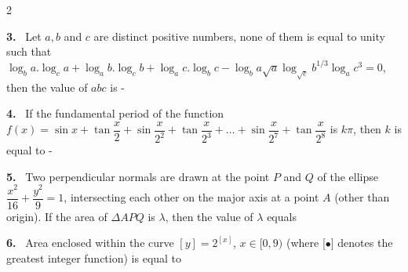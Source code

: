 \documentclass[10pt]{extarticle}
\newcommand{\qn}[1]{\par\smallskip\noindent\textbf{#1.}~}
\begin{document}
\begin{multicols}{2}
\qn{3} Let $a,b$ and $c$ are distinct positive numbers, none of them is equal to unity such that $\log_ba.\log_ca+\log_ab.\log_cb+\log_ac.\log_bc-\log_ba\sqrt a\log_{\sqrt c}b^{1/3}\log_ac^3=0$, then the value of $abc$ is -
\qn{4} If the fundamental period of the function $f(x)=\sin x+\tan\dfrac x2+\sin\dfrac x{2^2}+\tan\dfrac x{2^3}+\dots+\sin\dfrac x{2^7}+\tan\dfrac x{2^8}$ is $k\pi$, then $k$ is equal to -
\qn{5} Two perpendicular normals are drawn at the point $P$ and $Q$ of the ellipse $\dfrac{x^2}{16}+\dfrac{y^2}{9}=1$, intersecting each other on the major axis at a point $A$ (other than origin). If the area of $\Delta APQ$ is $\lambda$, then the value of $\lambda$ equals
\qn{6} Area enclosed within the curve $[y]=2^{[x]}$, $x\in[0,9)$ (where [$\bullet$] denotes the greatest integer function) is equal to
\end{multicols}
\end{document}
